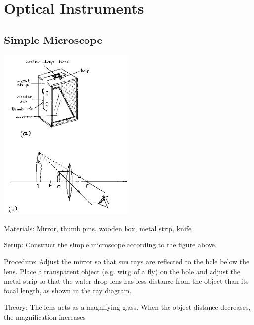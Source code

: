 \section{Optical Instruments}

\begin{multicols}{2}


\subsection{Simple Microscope}

\begin{center}
\includegraphics[width=0.5\textwidth]{./img/source/simple-microscope.png}
\end{center}

\begin{description*}
\item[Materials:]{Mirror, thumb pins, wooden box, metal strip, knife}
\item[Setup:]{Construct the simple microscope according to the figure above.}
\item[Procedure:]{Adjust the mirror so that sun rays are reflected to the hole below the lens. Place a transparent object (e.g. wing of a fly) on the hole and adjust the metal strip so that the water drop lens has less distance from the object than its focal length, as shown in the ray diagram.}
\item[Theory:]{The lens acts as a magnifying glass. When the object distance decreases, the magnification increases}
\end{description*}


\end{multicols}
